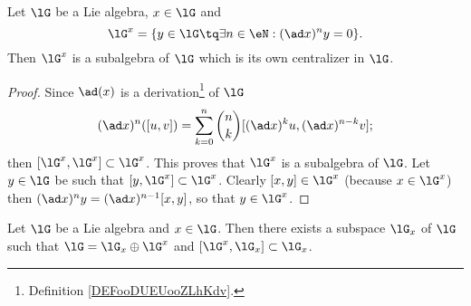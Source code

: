 \begin{proposition}\label{prop:G_x_central}
    Let $\lG$ be a Lie algebra, $x\in\lG$ and
        \begin{equation}
            \lG^x=\{y\in\lG\tq\exists n\in\eN:(\ad x)^ny=0\}.
        \end{equation}
    Then $\lG^x$ is a subalgebra of $\lG$ which is its own centralizer in $\lG$.
\end{proposition}

\begin{proof}
    Since $\ad(x)$ is a derivation\footnote{Definition \ref{DEFooDUEUooZLhKdv}.} of $\lG$
\[
(\ad x)^n([u,v])=\sum_{k=0}^n \binom{n}{k} [ (\ad x)^ku,(\ad x)^{n-k}v ];
\]
then $[\lG^x,\lG^x]\subset\lG^x$. This proves that $\lG^x$ is a subalgebra of $\lG$. Let $y\in\lG$ be such that $[y,\lG^x]\subset\lG^x$. Clearly $[x,y]\in\lG^x$ (because $x\in\lG^x$) then $(\ad x)^ny=(\ad x)^{n-1}[x,y]$, so that $y\in\lG^x$.
\end{proof}

\begin{proposition}
Let $\lG$ be a Lie algebra and $x\in\lG$. Then there exists a subspace $\lG_x$ of $\lG$ such that $\lG=\lG_x\oplus\lG^x$ and $[\lG^x,\lG_x]\subset\lG_x$.
\label{prop:G_x_G_x}
\end{proposition}

